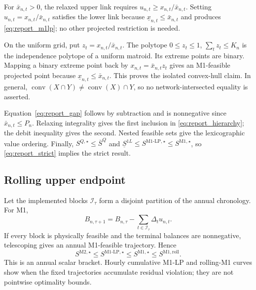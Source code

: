 \documentclass[10pt,journal,onecolumn]{IEEEtran}
\newcommand{\Mone}{\ensuremath{\mathrm{M1}}}
\newcommand{\MoneLP}{\ensuremath{\mathrm{M1\text{-}LP}}}
\newcommand{\Mtwo}{\ensuremath{\mathrm{M2}}}
\begin{document}
\begin{IEEEproof}
For $\bar x_{n,t}>0$, the relaxed upper link requires
$u_{n,t}\geq x_{n,t}/\bar x_{n,t}$. Setting
$u_{n,t}=x_{n,t}/\bar x_{n,t}$ satisfies the lower link because
$\underline x_{n,t}\leq\bar x_{n,t}$ and produces
\eqref{eq:report_m1lp}; no other projected restriction is needed.

On the uniform grid, put $z_t=x_{n,t}/\bar x_{n,t}$. The polytope
$0\leq z_t\leq1$, $\sum_tz_t\leq K_n$ is the independence polytope of a
uniform matroid. Its extreme points are binary. Mapping a binary extreme point
back by $x_{n,t}=\bar x_{n,t}z_t$ gives an M1-feasible projected point because
$\underline x_{n,t}\leq\bar x_{n,t}$. This proves the isolated convex-hull
claim. In general,
$\operatorname{conv}(X\cap Y)\neq\operatorname{conv}(X)\cap Y$, so no
network-intersected equality is asserted.

Equation~\eqref{eq:report_gap} follows by subtraction and is nonnegative since
$\bar x_{n,t}\leq P_n$. Relaxing integrality gives the first inclusion in
\eqref{eq:report_hierarchy}; the debit inequality gives the second. Nested
feasible sets give the lexicographic value ordering. Finally,
$S^{Q,\star}\leq\overline S^Q$ and
$\underline S^{1L}\leq S^{\MoneLP,\star}\leq S^{\Mone,\star}$, so
\eqref{eq:report_strict} implies the strict result.
\end{IEEEproof}

\subsection{Rolling upper endpoint}

Let the implemented blocks $\mathcal I_\tau$ form a disjoint partition of the
annual chronology. For M1,
\begin{equation}
B_{n,\tau+1}=B_{n,\tau}
-\sum_{t\in\mathcal I_\tau}\Delta_tu_{n,t}.
\label{eq:report_m1_ledger}
\end{equation}
If every block is physically feasible and the terminal balances are
nonnegative, telescoping gives an annual M1-feasible trajectory. Hence
\begin{equation}
S^{\Mtwo,\star}\leq S^{\MoneLP,\star}
\leq S^{\Mone,\star}\leq S^{\Mone,\mathrm{roll}}.
\label{eq:report_scalar_bracket}
\end{equation}
This is an annual scalar bracket. Hourly cumulative M1-LP and rolling-M1 curves
show when the fixed trajectories accumulate residual violation; they are not
pointwise optimality bounds.
\end{document}
